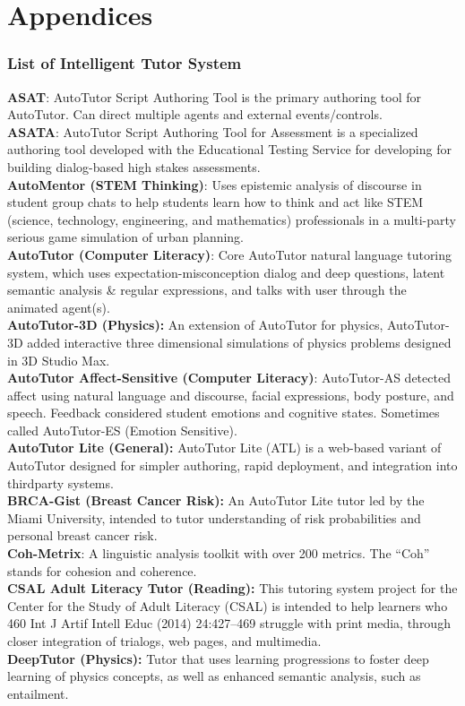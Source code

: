 \documentclass{beamer}
\begin{document}
\section{Appendices}
\begin{frame}

\frametitle{List of Intelligent Tutor System}


{\tiny \textbf{ASAT}: AutoTutor Script Authoring Tool is the primary authoring tool for AutoTutor.
Can direct multiple agents and external events/controls.\\
\textbf{ASATA}: AutoTutor Script Authoring Tool for Assessment is a specialized authoring
tool developed with the Educational Testing Service for developing for building dialog-based high stakes assessments.\\
\textbf{AutoMentor (STEM Thinking)}: Uses epistemic analysis of discourse in student group
chats to help students learn how to think and act like STEM (science, technology, engineering, and mathematics) professionals in a multi-party serious game
simulation of urban planning.\\
\textbf{AutoTutor (Computer Literacy)}: Core AutoTutor natural language tutoring system,
which uses expectation-misconception dialog and deep questions, latent
semantic analysis \& regular expressions, and talks with user through the
animated agent(s).\\
\textbf{AutoTutor-3D (Physics):} An extension of AutoTutor for physics, AutoTutor-3D
added interactive three dimensional simulations of physics problems designed
in 3D Studio Max.\\
\textbf{AutoTutor Affect-Sensitive (Computer Literacy)}: AutoTutor-AS detected affect
using natural language and discourse, facial expressions, body posture, and
speech. Feedback considered student emotions and cognitive states. Sometimes
called AutoTutor-ES (Emotion Sensitive).\\
\textbf{AutoTutor Lite (General):} AutoTutor Lite (ATL) is a web-based variant of AutoTutor
designed for simpler authoring, rapid deployment, and integration into thirdparty systems.\\
\textbf{BRCA-Gist (Breast Cancer Risk):} An AutoTutor Lite tutor led by the Miami University, intended to tutor understanding of risk probabilities and personal breast
cancer risk.\\
\textbf{Coh-Metrix}: A linguistic analysis toolkit with over 200 metrics. The “Coh” stands for
cohesion and coherence.\\
\textbf{CSAL Adult Literacy Tutor (Reading):} This tutoring system project for the Center
for the Study of Adult Literacy (CSAL) is intended to help learners who
460 Int J Artif Intell Educ (2014) 24:427–469
struggle with print media, through closer integration of trialogs, web pages, and
multimedia.\\
\textbf{DeepTutor (Physics):} Tutor that uses learning progressions to foster deep learning of physics concepts, as well as enhanced semantic analysis, such as entailment.\\
 }
\end{frame}
\end{document}
